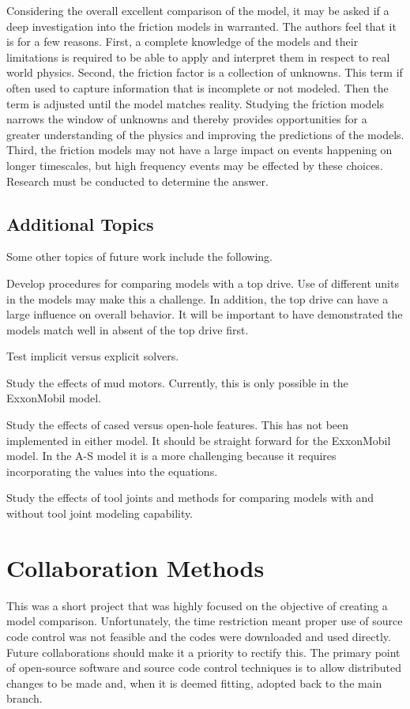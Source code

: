Considering the overall excellent comparison of the model, it may be asked if a deep investigation into the friction models in warranted. The authors feel that it is for a few reasons.  First, a complete knowledge of the models and their limitations is required to be able to apply and interpret them in respect to real world physics.  Second, the friction factor is a collection of unknowns.  This term if often used to capture information that is incomplete or not modeled.  Then the term is adjusted until the model matches reality.  Studying the friction models narrows the window of unknowns and thereby provides opportunities for a greater understanding of the physics and improving the predictions of the models.  Third, the friction models may not have a large impact on events happening on longer timescales, but high frequency events may be effected by these choices.  Research must be conducted to determine the answer.

\subsection{Additional Topics}
Some other topics of future work include the following.
\begin{bulletedlist}
    \item Develop procedures for comparing models with a top drive.  Use of different units in the models may make this a challenge.  In addition, the top drive can have a large influence on overall behavior.  It will be important to have demonstrated the models match well in absent of the top drive first.
	\item Test implicit versus explicit solvers.
	\item Study the effects of mud motors.  Currently, this is only possible in the ExxonMobil model.
    \item Study the effects of cased versus open-hole features.  This has not been implemented in either model.  It should be straight forward for the ExxonMobil model.  In the A-S model it is a more challenging because it requires incorporating the values into the equations.
    \item Study the effects of tool joints and methods for comparing models with and without tool joint modeling capability.
\end{bulletedlist}

\section{Collaboration Methods}
This was a short project that was highly focused on the objective of creating a model comparison.  Unfortunately, the time restriction meant proper use of source code control was not feasible and the codes were downloaded and used directly.  Future collaborations should make it a priority to rectify this.  The primary point of open-source software and source code control techniques is to allow distributed changes to be made and, when it is deemed fitting, adopted back to the main branch.

